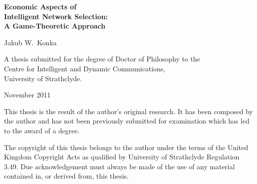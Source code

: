 \begin{titlepage}
\begin{RaggedRight}

\vspace*{2.2cm}

{\bf\sffamily\Huge Economic Aspects of}\\[1ex]
{\bf\sffamily\Huge Intelligent Network Selection:}\\[1ex]
{\bf\sffamily\Huge A Game-Theoretic Approach}

\par
\vspace{2cm}

{\sffamily\Large Jakub W.~Konka}

\par
\vspace{6.5cm}

A thesis submitted for the degree of Doctor of Philosophy to the \\Centre for Intelligent and Dynamic Communications,\\ University of Strathclyde.

\par
\vspace{1cm}

November 2011

\cleardoublepage


\vspace*{2.2cm}

This thesis is the result of the author's original research. It has been composed by the author and has not been previously submitted for examination which has led to the award of a degree.

\cleardoublepage

\vspace*{2.2cm}

The copyright of this thesis belongs to the author under the terms of the United Kingdom Copyright Acts as qualified by University of Strathclyde Regulation 3.49. Due acknowledgement must always be made of the use of any material contained in, or derived from, this thesis.

\cleardoublepage
\end{RaggedRight}
\end{titlepage}